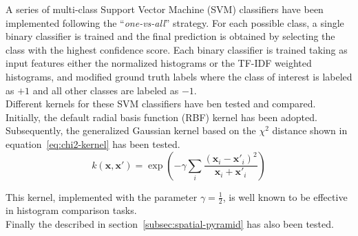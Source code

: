 \documentclass[../main.tex]{subfiles}
\begin{document}
A series of multi-class Support Vector Machine (SVM) classifiers have been implemented
following the ``\textit{one-vs-all}'' strategy. For each possible class, a single binary classifier is trained and the final prediction is obtained by selecting the class with the highest confidence score. Each binary classifier is trained taking as input features either the normalized histograms or the TF-IDF weighted histograms, and modified ground truth labels where the class of interest is labeled as $+1$ and all other classes are labeled as $-1$.\\
Different kernels for these SVM classifiers have ben tested and compared. Initially, the default radial basis function (RBF) kernel has been adopted. Subsequently, the generalized Gaussian kernel based on the $\chi^2$ distance shown in equation~\ref{eq:chi2-kernel} has been tested. 
\begin{equation}\label{eq:chi2-kernel}
  k(\mathbf{x}, \mathbf{x}') = \exp\left(-\gamma \sum_i \frac{(\mathbf{x}_i - \mathbf{x}'_i)^2}{\mathbf{x}_i + \mathbf{x}'_i}\right)
\end{equation}

This kernel, implemented with the parameter $\gamma = \frac{1}{2}$, is well known to be effective in histogram comparison tasks.\\
Finally the  described in section~\ref{subsec:spatial-pyramid} has also been tested.
\end{document}
